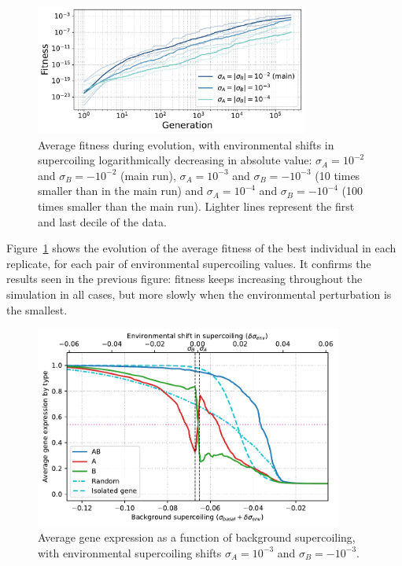 \begin{figure}[H]
\centering
\includegraphics[width=0.8\textwidth]{param/sigma/fitness_all_with_main.pdf}
\caption[Average fitness during evolution, with decreasing environmental supercoiling shifts]{Average fitness during evolution, with environmental shifts in supercoiling logarithmically decreasing in absolute value: $\sigma_A = 10^{-2}$ and $\sigma_B = -10^{-2}$ (main run), $\sigma_A = 10^{-3}$ and $\sigma_B = -10^{-3}$ (10 times smaller than in the main run) and $\sigma_A = 10^{-4}$ and $\sigma_B = -10^{-4}$ (100 times smaller than the main run).
Lighter lines represent the first and last decile of the data.}
\label{fig:param:sigma-fitness}
\end{figure}

Figure~\ref{fig:param:sigma-fitness} shows the evolution of the average fitness of the best individual in each replicate, for each pair of environmental supercoiling values.
It confirms the results seen in the previous figure: fitness keeps increasing throughout the simulation in all cases, but more slowly when the environmental perturbation is the smallest.

\begin{figure}[H]
\centering
\includegraphics[width=0.9\textwidth]{param/sigma/sigma-1e-3/activity_sigmas_avg.pdf}
\caption[Average gene expression as a function of background supercoiling, with an absolute environmental supercoiling shift of 0.001]{Average gene expression as a function of background supercoiling, with environmental supercoiling shifts $\sigma_A = 10^{-3}$ and $\sigma_B = -10^{-3}$.}
\label{fig:param:sigma-1e-3-activ-by-sigma}
\end{figure}

